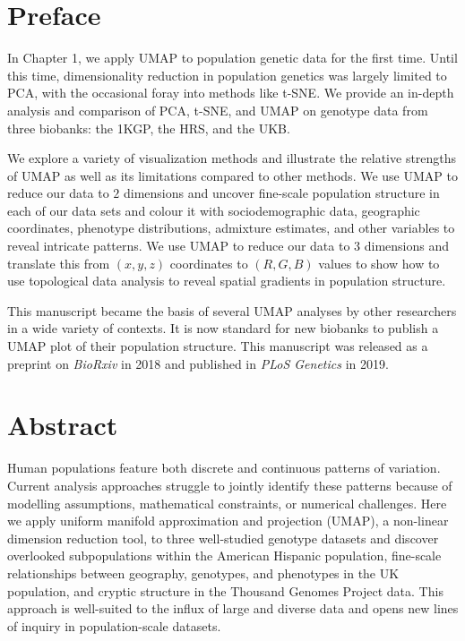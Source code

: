 \setcounter{section}{-1}

\section{Preface}

In Chapter 1, we apply UMAP to population genetic data for the first time. Until this time, dimensionality reduction in population genetics was largely limited to PCA, with the occasional foray into methods like t-SNE. We provide an in-depth analysis and comparison of PCA, t-SNE, and UMAP on genotype data from three biobanks: the 1KGP, the HRS, and the UKB.

We explore a variety of visualization methods and illustrate the relative strengths of UMAP as well as its limitations compared to other methods. We use UMAP to reduce our data to $2$ dimensions and uncover fine-scale population structure in each of our data sets and colour it with sociodemographic data, geographic coordinates, phenotype distributions, admixture estimates, and other variables to reveal intricate patterns. We use UMAP to reduce our data to $3$ dimensions and translate this from $(x,y,z)$ coordinates to $(R,G,B)$ values to show how to use topological data analysis to reveal spatial gradients in population structure.

This manuscript became the basis of several UMAP analyses by other researchers in a wide variety of contexts. It is now standard for new biobanks to publish a UMAP plot of their population structure. This manuscript was released as a preprint on \textit{BioRxiv} in 2018 and published in \textit{PLoS Genetics} in 2019.

\clearpage

\section{Abstract}

Human populations feature both discrete and continuous patterns of variation. Current analysis approaches struggle to jointly identify these patterns because of modelling assumptions, mathematical constraints, or numerical challenges. Here we apply uniform manifold approximation and projection (UMAP), a non-linear dimension reduction tool, to three well-studied genotype datasets and discover overlooked subpopulations within the American Hispanic population, fine-scale relationships between geography, genotypes, and phenotypes in the UK population, and cryptic structure in the Thousand Genomes Project data. This approach is well-suited to the influx of large and diverse data and opens new lines of inquiry in population-scale datasets.

